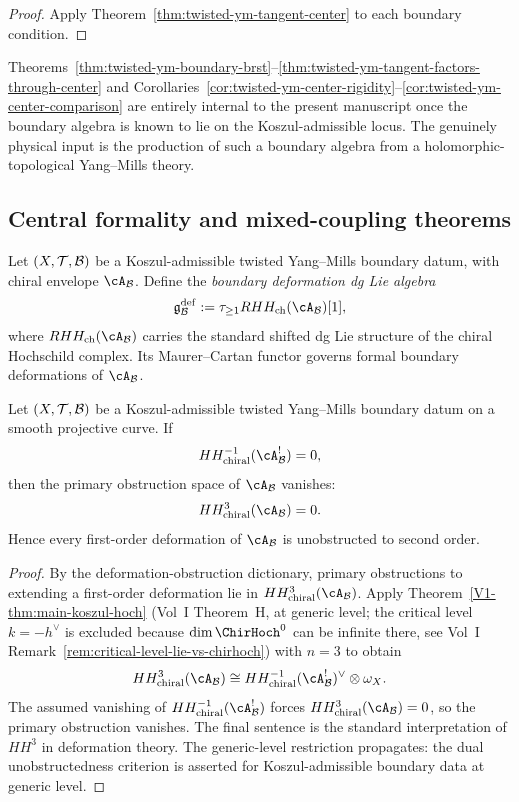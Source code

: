 \begin{proof}
Apply Theorem~\ref{thm:twisted-ym-tangent-center} to each boundary condition.
\end{proof}

\begin{remark}
Theorems~\ref{thm:twisted-ym-boundary-brst}--\ref{thm:twisted-ym-tangent-factors-through-center}
and Corollaries~\ref{cor:twisted-ym-center-rigidity}--\ref{cor:twisted-ym-center-comparison}
are entirely internal to the present manuscript once the boundary algebra is known to lie on
the Koszul-admissible locus. The genuinely physical input is the production of such a
boundary algebra from a holomorphic-topological Yang--Mills theory.
\end{remark}

\subsection{Central formality and mixed-coupling theorems}

\begin{definition}
Let $(X,\mathcal{T},\mathcal{B})$ be a Koszul-admissible twisted Yang--Mills boundary datum, with chiral envelope $\cA_{\cB}$. Define the \emph{boundary deformation dg Lie algebra}
\[
\mathfrak{g}^{\mathrm{def}}_{\cB}
:=
\tau_{\ge 1} RHH_{\mathrm{ch}}(\cA_{\cB})[1],
\]
where $RHH_{\mathrm{ch}}(\cA_{\cB})$ carries the standard shifted dg Lie structure of the chiral Hochschild complex. Its Maurer--Cartan functor governs formal boundary deformations of $\cA_{\cB}$.
\end{definition}

\begin{theorem}
Let $(X,\mathcal{T},\mathcal{B})$ be a Koszul-admissible twisted Yang--Mills boundary datum on a smooth projective curve. If
\[
HH^{-1}_{\mathrm{chiral}}(\cA_{\cB}^{!}) = 0,
\]
then the primary obstruction space of $\cA_{\cB}$ vanishes:
\[
HH^{3}_{\mathrm{chiral}}(\cA_{\cB}) = 0.
\]
Hence every first-order deformation of $\cA_{\cB}$ is unobstructed to second order.
\end{theorem}

\begin{proof}
By the deformation-obstruction dictionary, primary obstructions to extending a first-order deformation lie in $HH^{3}_{\mathrm{chiral}}(\cA_{\cB})$. Apply Theorem~\ref*{V1-thm:main-koszul-hoch} (Vol~I Theorem~H, at generic level; the critical level $k = -h^\vee$ is excluded because $\dim \ChirHoch^0$ can be infinite there, see Vol~I Remark~\ref*{rem:critical-level-lie-vs-chirhoch}) with $n=3$ to obtain
\[
HH^{3}_{\mathrm{chiral}}(\cA_{\cB})
\cong
HH^{-1}_{\mathrm{chiral}}(\cA_{\cB}^{!})^{\vee}\otimes \omega_X.
\]
The assumed vanishing of $HH^{-1}_{\mathrm{chiral}}(\cA_{\cB}^{!})$ forces $HH^{3}_{\mathrm{chiral}}(\cA_{\cB})=0$, so the primary obstruction vanishes. The final sentence is the standard interpretation of $HH^3$ in deformation theory. The generic-level restriction propagates: the dual unobstructedness criterion is asserted for Koszul-admissible boundary data at generic level.
\end{proof}

